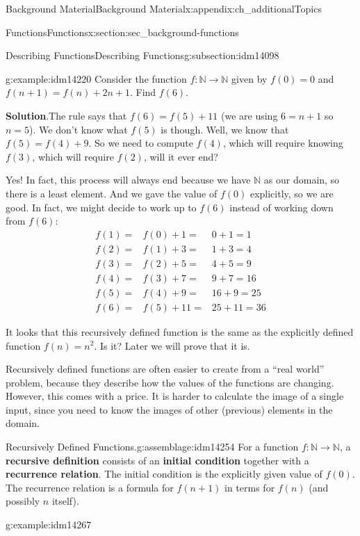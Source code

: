 \documentclass[oneside,10pt,]{book}
\newcommand{\terminology}[1]{\textbf{#1}}
\numberwithin{equation}{chapter}
\def\N{\mathbb N}
\newcommand{\amp}{&}
\begin{document}
\begin{appendixptx}{Background Material}{}{Background Material}{}{}{x:appendix:ch_additionalTopics}
\begin{sectionptx}{Functions}{}{Functions}{}{}{x:section:sec_background-functions}
\begin{subsectionptx}{Describing Functions}{}{Describing Functions}{}{}{g:subsection:idm14098}
\begin{example}{}{g:example:idm14220}%
Consider the function \(f:\N \to \N\) given by \(f(0) = 0\) and \(f(n+1) = f(n) + 2n+1\).  Find \(f(6)\).%
\par\smallskip%
\noindent\textbf{Solution}.\hypertarget{g:solution:idm14227}{}\quad{}The rule says that \(f(6) = f(5) + 11\) (we are using \(6 = n+1\) so \(n = 5\)).  We don't know what \(f(5)\) is though.  Well, we know that \(f(5) = f(4) + 9\).  So we need to compute \(f(4)\), which will require knowing \(f(3)\), which will require \(f(2)\),\textellipsis{} will it ever end?%
\par
Yes!  In fact, this process will always end because we have \(\N\) as our domain, so there is a least element.  And we gave the value of \(f(0)\) explicitly, so we are good.  In fact, we might decide to work up to \(f(6)\) instead of working down from \(f(6)\):%
\begin{align*}
f(1) = \amp f(0) + 1 = \amp 0 + 1 = 1\\
f(2) = \amp f(1) + 3 = \amp 1 + 3 = 4\\
f(3) = \amp f(2) + 5 = \amp 4 + 5 = 9\\
f(4) = \amp f(3) + 7 = \amp 9 + 7 = 16\\
f(5) = \amp f(4) + 9 = \amp 16 + 9 = 25\\
f(6) = \amp f(5) + 11 = \amp 25 + 11 = 36
\end{align*}
%
\par
It looks that this recursively defined function is the same as the explicitly defined function \(f(n) = n^2\).  Is it?  Later we will prove that it is.%
\end{example}
Recursively defined functions are often easier to create from a ``real world'' problem, because they describe how the values of the functions are changing.  However, this comes with a price. It is harder to calculate the image of a single input, since you need to know the images of other (previous) elements in the domain.%
\begin{assemblage}{Recursively Defined Functions.}{g:assemblage:idm14254}%
For a function \(f:\N \to \N\), a \terminology{recursive definition} consists of an \terminology{initial condition} together with a \terminology{recurrence relation}.  The initial condition is the explicitly given value of \(f(0)\). The recurrence relation is a formula for \(f(n+1)\) in terms for \(f(n)\) (and possibly \(n\) itself).%
\end{assemblage}
\begin{example}{}{g:example:idm14267}%

\end{example}
\end{subsectionptx}
\end{sectionptx}
\end{appendixptx}
\end{document}
